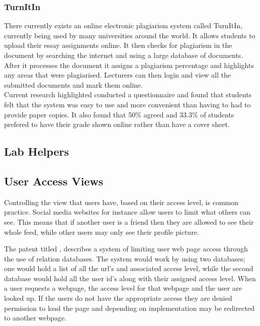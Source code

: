 \documentclass[12pt]{article}  %
\begin{document}
\subsubsection{TurnItIn}
There currently exists an online electronic plagiarism system called TurnItIn, \cite{_turnitin_????} currently being used by many universities around the world. It allows students to upload their essay assignments online. It then checks for plagiarism in the document by searching the internet and using a large database of documents. After it processes the document it assigns a plagiarism percentage and highlights any areas that were plagiarised. Lecturers can then login and view all the submitted documents and mark them online.\\
Current research highlighted \cite{dahl_turnitin_2007} conducted a questionnaire and found that students felt that the system was easy to use and more convenient than having to had to provide paper copies. It also found that 50\% agreed and 33.3\% of students prefered to have their grade shown online rather than have a cover sheet.


\subsection{Lab Helpers}


\newpage
\subsection{User Access Views}

Controlling the view that users have, based on their access level, is common practice. Social media websites for instance allow users to limit what others  can see. This means that if another user is a friend then they are allowed to see their whole feed, while other users may only see their profile picture.

The patent titled  \cite{baker_system_1997}, describes a system of limiting user web page access through the use of relation databases. The system would work by using two databases; one would hold a list of all the url's and associated access level, while the second database would hold all the user id's along with their assigned access level. When a user requests a webpage, the access level for that webpage and the user are looked up. If the users do not have the appropriate access they are denied permission to load the page and depending on implementation may be redirected to another webpage.
\end{document}
